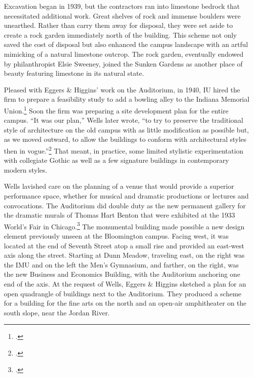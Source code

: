 \documentclass[
  american,
  letterpaper,
]{scrreprt}
\begin{document}
Excavation began in 1939, but the contractors ran into limestone bedrock
that necessitated additional work. Great shelves of rock and immense
boulders were unearthed. Rather than carry them away for disposal, they
were set aside to create a rock garden immediately north of the
building. This scheme not only saved the cost of disposal but also
enhanced the campus landscape with an artful mimicking of a natural
limestone outcrop. The rock garden, eventually endowed by philanthropist
Elsie Sweeney, joined the Sunken Gardens as another place of beauty
featuring limestone in its natural state.

Pleased with Eggers \& Higgins' work on the Auditorium, in 1940, IU
hired the firm to prepare a feasibility study to add a bowling alley to
the Indiana Memorial Union.\footnote{.}
Soon the firm was preparing a site development plan for the entire
campus. ``It was our plan,'' Wells later wrote, ``to try to preserve the
traditional style of architecture on the old campus with as little
modification as possible but, as we moved outward, to allow the
buildings to conform with architectural styles then in
vogue.''\footnote{.} That meant, in practice, some limited stylistic experimentation
with collegiate Gothic as well as a few signature buildings in
contemporary modern styles.

Wells lavished care on the planning of a venue that would provide a
superior performance space, whether for musical and dramatic productions
or lectures and convocations. The Auditorium did double duty as the new
permanent gallery for the dramatic murals of Thomas Hart Benton that
were exhibited at the 1933 World's Fair in Chicago.\footnote{.} The monumental building
made possible a new design element previously unseen at the Bloomington
campus. Facing west, it was located at the end of Seventh Street atop a
small rise and provided an east-west axis along the street. Starting at
Dunn Meadow, traveling east, on the right was the IMU and on the left
the Men's Gymnasium, and farther, on the right, was the new Business and
Economics Building, with the Auditorium anchoring one end of the axis.
At the request of Wells, Eggers \& Higgins sketched a plan for an open
quadrangle of buildings next to the Auditorium. They produced a scheme
for a building for the fine arts on the north and an open-air
amphitheater on the south slope, near the Jordan River.
\end{document}

